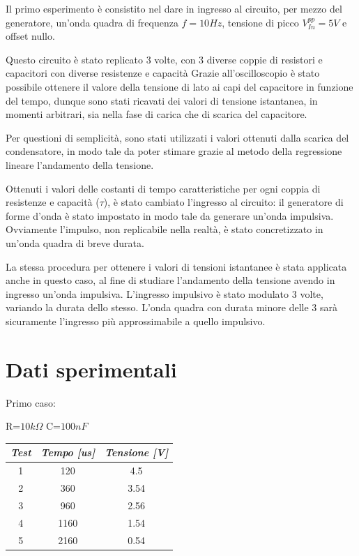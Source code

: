     Il primo esperimento è consistito nel dare in ingresso al circuito, per mezzo del generatore,
    un'onda quadra di frequenza $f = 10Hz$, tensione di picco $V_{In}^{pp} = 5V$ e offset nullo.\par
    Questo circuito è stato replicato 3 volte, con 3 diverse coppie di resistori e capacitori con diverse
    resistenze e capacità
    Grazie all'oscilloscopio è stato possibile ottenere il valore della tensione di lato ai capi 
    del capacitore in funzione del tempo, dunque sono stati ricavati dei valori di tensione istantanea,
    in momenti arbitrari, sia nella fase di carica che di scarica del capacitore.  \par
    Per questioni di semplicità, sono stati utilizzati i valori ottenuti dalla scarica del condensatore, in modo tale
    da poter stimare grazie al metodo della regressione lineare l'andamento della tensione.\par
    Ottenuti i valori delle costanti di tempo caratteristiche per ogni coppia di resistenze e capacità ($\tau$),
    è stato cambiato l'ingresso al circuito: il generatore di forme d'onda è stato impostato in modo tale da generare
    un'onda impulsiva. Ovviamente l'impulso, non replicabile nella realtà, è stato concretizzato in un'onda quadra di breve
    durata. \par
    La stessa procedura per ottenere i valori di tensioni istantanee è stata applicata anche in questo caso,
    al fine di studiare l'andamento della tensione avendo in ingresso un'onda impulsiva.
    L'ingresso impulsivo è stato modulato 3 volte, variando la durata dello stesso.
    L'onda quadra con durata minore delle 3 sarà sicuramente l'ingresso più approssimabile a quello impulsivo. \par
    

    \section{Dati sperimentali}

    \begin{center}
        Primo caso: \par
        R=$10k\Omega$ C=$100nF$
    \end{center}
    \begin{center}
    \begin{tabular}{|c|c|c|}
        \hline
        \textit{Test} & \textit{Tempo [us]} & \textit{Tensione [V]} \\
        \hline
        1 & 120 & 4.5 \\
        \hline
        2 & 360 & 3.54 \\
        \hline
        3 & 960 & 2.56 \\
        \hline
        4 & 1160 & 1.54 \\
        \hline
        5 & 2160 & 0.54 \\
        \hline
    \end{tabular}
    \end{center}
    
